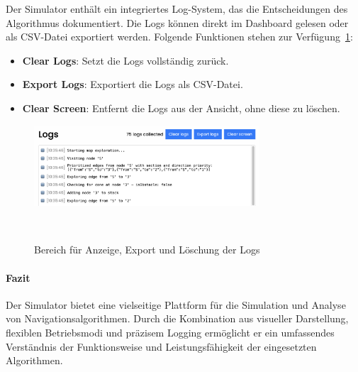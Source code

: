 \documentclass[main.tex]{subfiles} %
\begin{document}
Der Simulator enthält ein integriertes Log-System, das die
Entscheidungen des Algorithmus dokumentiert. Die Logs können direkt
im Dashboard gelesen oder als CSV-Datei exportiert werden. Folgende
Funktionen stehen zur Verfügung~\ref{fig:DashboardLogs}:

\begin{itemize}
  \item \textbf{Clear Logs}:
    Setzt die Logs vollständig zurück.

  \item \textbf{Export Logs}:
    Exportiert die Logs als CSV-Datei.

  \item \textbf{Clear Screen}:
    Entfernt die Logs aus der Ansicht, ohne diese zu löschen.
\end{itemize}

\begin{figure}[H]
  \centering
  \includegraphics[width=0.75\textwidth]{./fig_Simulation/SimulatorLogs.png}
  \caption{Bereich für Anzeige, Export und Löschung der
  Logs}~\label{fig:DashboardLogs}
\end{figure}

\paragraph{Fazit}

Der Simulator bietet eine vielseitige Plattform für die Simulation
und Analyse von Navigationsalgorithmen. Durch die Kombination aus
visueller Darstellung, flexiblen Betriebsmodi und präzisem Logging
ermöglicht er ein umfassendes Verständnis der Funktionsweise und
Leistungsfähigkeit der eingesetzten Algorithmen.
\end{document}
